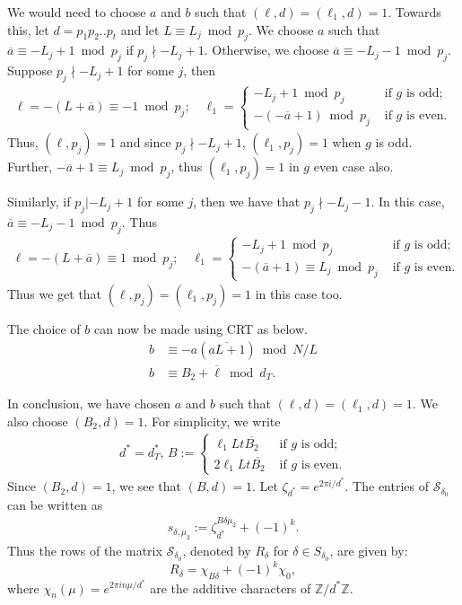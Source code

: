 \documentclass[11pt]{amsart}
\numberwithin{equation}{section}
\newcommand{\mc}{\mathcal}
\newcommand{\q}{\quad}
\begin{document}
We would need to choose $a$ and $b$ such that $(\ell, d)=(\ell_1, d)=1$. Towards this, let $d=p_1p_2..p_t$ and let $L\equiv L_j\bmod p_j$. We choose $a$ such that $\overline{a}\equiv -L_j+1\bmod p_j$ if $p_j\nmid -L_j+1$. Otherwise, we choose $\overline{a}\equiv -L_j-1\bmod p_j$. Suppose $p_j\nmid -L_j+1$ for some $j$, then
\begin{align}
   \ell= -(L+\overline{a})\equiv -1\bmod p_j; \q \ell_1=\begin{cases}
        -L_j+1\bmod p_j& \text { if } g \text{ is odd};\\
        -(-\overline{a}+1)\bmod p_j & \text { if } g \text{ is even}.
    \end{cases}
\end{align}
Thus, $(\ell, p_j)=1$ and since $p_j\nmid -L_j+1$, $(\ell_1, p_j)=1$ when $g$ is odd. Further, $-\overline{a}+1\equiv L_j\bmod p_j $, thus $(\ell_1, p_j)=1$ in $g$ even case also.

Similarly, if $p_j|-L_j+1$ for some $j$, then we have that $p_j\nmid -L_j-1$. In this case, $\overline{a}\equiv -L_j-1\bmod p_j$. Thus
\begin{align}
   \ell= -(L+\overline{a})\equiv 1\bmod p_j;\q \ell_1=\begin{cases}
        -L_j+1\bmod p_j& \text { if } g \text{ is odd};\\
        -(\overline{a}+1)\equiv L_j\bmod p_j & \text { if } g \text{ is even}.
    \end{cases}
\end{align}
Thus we get that $(\ell, p_j)=(\ell_1, p_j)=1$ in this case too. 

 The choice of $b$ can now be made using CRT as below.
\begin{align}
    b&\equiv -a(\overline{aL+1})\bmod N/L\\
    b&\equiv B_2+\overline{\ell}\bmod d_T.
\end{align}

In conclusion, we have chosen $a$ and $b$ such that $(\ell, d)=(\ell_1, d)=1$. We also choose $(B_2, d)=1$. For simplicity, we write 
\begin{align}
d^*=d_T^*,\, B:=
\begin{cases}
\ell_1Lt\overline{B_2} & \text{ if } g \text{ is odd;}\\ 2\ell_1Lt\overline{B_2} & \text{ if } g \text{ is even}.
\end{cases}
\end{align}
Since $(B_2,d)=1$, we see that $(B, d)=1$. Let $\zeta_{d^*} = e^{2\pi i / d^*}$. The entries of $\mc S_{\delta_{0}}$ can be written as
\begin{align}
    s_{\delta, \mu_2}:=\zeta_{d^*}^{B\delta\mu_2}+(-1)^k.
\end{align}
Thus the rows of the matrix $\mc S_{\delta_{0}}$, denoted by $R_\delta$ for $\delta \in S_{\delta_{0}}$, are given by:
\[
R_\delta = \chi_{B\delta} + (-1)^k\chi_0,
\]
where $\chi_n(\mu) = e^{2\pi i n \mu / d^*}$ are the additive characters of $\mathbb{Z}/d^*\mathbb{Z}$.
\end{document}
